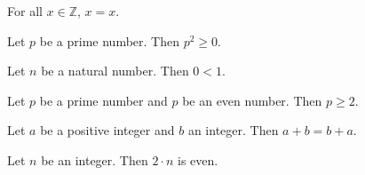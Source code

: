 \begin{theorem}[Reflexivity]
For all $x \in \mathbb{Z}$, $x = x$.
\end{theorem}


\begin{theorem}
Let $p$ be a prime number. Then $p^2 \geq 0$.
\end{theorem}


\begin{theorem}
Let $n$ be a natural number. Then $0 < 1$.
\end{theorem}


\begin{theorem}
Let $p$ be a prime number and $p$ be an even number. Then $p \geq 2$.
\end{theorem}


\begin{theorem}
Let $a$ be a positive integer and $b$ an integer. Then $a + b = b + a$.
\end{theorem}


\begin{theorem}
Let $n$ be an integer. Then $2 \cdot n$ is even.
\end{theorem}
